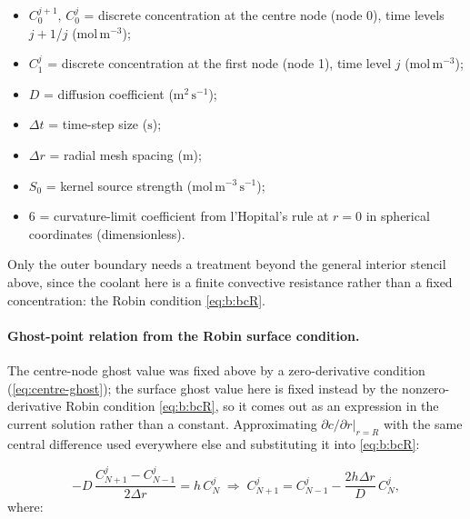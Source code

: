 \documentclass[11pt,a4paper]{article}
\newcommand{\Cd}[2]{C_{#1}^{#2}}
\newcommand{\dr}{\Delta r}
\begin{document}
\begin{itemize}[leftmargin=1.6em,itemsep=1pt,topsep=3pt,parsep=0pt]
  \item $C_0^{j+1},\,C_0^{j}$ = discrete concentration at the centre node (node 0), time levels $j{+}1$/$j$ ($\mathrm{mol\,m^{-3}}$);
  \item $C_1^{j}$ = discrete concentration at the first node (node 1), time level $j$ ($\mathrm{mol\,m^{-3}}$);
  \item $D$ = diffusion coefficient ($\mathrm{m^{2}\,s^{-1}}$);
  \item $\Delta t$ = time-step size ($\mathrm{s}$);
  \item $\Delta r$ = radial mesh spacing ($\mathrm{m}$);
  \item $S_0$ = kernel source strength ($\mathrm{mol\,m^{-3}\,s^{-1}}$);
  \item $6$ = curvature-limit coefficient from l'Hopital's rule at $r=0$ in spherical coordinates (dimensionless).
\end{itemize}

Only the outer boundary needs a treatment beyond the general
interior stencil above, since the coolant here is a finite convective
resistance rather than a fixed concentration: the Robin condition
\cref{eq:b:bcR}.

\paragraph{Ghost-point relation from the Robin surface condition.}
The centre-node ghost value was fixed above by a zero-derivative condition
(\cref{eq:centre-ghost}); the surface ghost value here is fixed instead by
the nonzero-derivative Robin condition \cref{eq:b:bcR}, so it comes out as
an expression in the current solution rather than a constant. Approximating
$\partial c/\partial r|_{r=R}$ with the same central difference used
everywhere else and substituting it into \cref{eq:b:bcR}:

\begin{equation}
-D\,\frac{\Cd{N+1}{j}-\Cd{N-1}{j}}{2\dr} = h\,\Cd{N}{j}
\;\Longrightarrow\;
\Cd{N+1}{j} = \Cd{N-1}{j} - \frac{2h\dr}{D}\,\Cd{N}{j},
\label{eq:b:ftcs-ghost}
\end{equation}
\vspace{-0.3em}
\noindent where:
\end{document}
